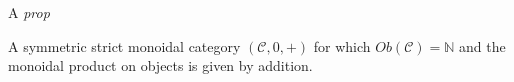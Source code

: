 A \emph{prop}

A symmetric strict monoidal category $(\mathcal{C}, 0,+)$ for which $Ob(\mathcal{C})=\mathbb{N}$ and the monoidal product on objects is given by addition.
